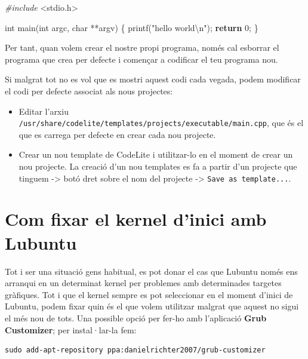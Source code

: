 \documentclass[]{book}
\newenvironment{Shaded}{\begin{snugshade}}{\end{snugshade}}
\newcommand{\DataTypeTok}[1]{\textcolor[rgb]{0.13,0.29,0.53}{#1}}
\newcommand{\DecValTok}[1]{\textcolor[rgb]{0.00,0.00,0.81}{#1}}
\newcommand{\SpecialCharTok}[1]{\textcolor[rgb]{0.00,0.00,0.00}{#1}}
\newcommand{\StringTok}[1]{\textcolor[rgb]{0.31,0.60,0.02}{#1}}
\newcommand{\ImportTok}[1]{#1}
\newcommand{\ControlFlowTok}[1]{\textcolor[rgb]{0.13,0.29,0.53}{\textbf{#1}}}
\newcommand{\PreprocessorTok}[1]{\textcolor[rgb]{0.56,0.35,0.01}{\textit{#1}}}
\newcommand{\NormalTok}[1]{#1}
\providecommand{\tightlist}{%
  \setlength{\itemsep}{0pt}\setlength{\parskip}{0pt}}
\begin{document}
\begin{Shaded}
\begin{Highlighting}[]
\PreprocessorTok{#include }\ImportTok{<stdio.h>}

\DataTypeTok{int}\NormalTok{ main(}\DataTypeTok{int}\NormalTok{ argc, }\DataTypeTok{char}\NormalTok{ **argv)}
\NormalTok{\{}
\NormalTok{    printf(}\StringTok{"hello world}\SpecialCharTok{\textbackslash{}n}\StringTok{"}\NormalTok{);}
    \ControlFlowTok{return} \DecValTok{0}\NormalTok{;}
\NormalTok{\}}
\end{Highlighting}
\end{Shaded}

Per tant, quan volem crear el nostre propi programa, només cal esborrar
el programa que crea per defecte i començar a codificar el teu programa
nou.

Si malgrat tot no es vol que es mostri aquest codi cada vegada, podem
modificar el codi per defecte associat als nous projectes:

\begin{itemize}
\tightlist
\item
  Editar l'arxiu
  \texttt{/usr/share/codelite/templates/projects/executable/main.cpp},
  que és el que es carrega per defecte en crear cada nou projecte.
\item
  Crear un nou template de CodeLite i utilitzar-lo en el moment de crear
  un nou projecte. La creació d'un nou templates es fa a partir d'un
  projecte que tinguem -\textgreater{} botó dret sobre el nom del
  projecte -\textgreater{} \texttt{Save\ as\ template...}.
\end{itemize}

\section{Com fixar el kernel d'inici amb
Lubuntu}\label{com-fixar-el-kernel-dinici-amb-lubuntu}

Tot i ser una situació gens habitual, es pot donar el cas que Lubuntu
només ens arranqui en un determinat kernel per problemes amb
determinades targetes gràfiques. Tot i que el kernel sempre es pot
seleccionar en el moment d'inici de Lubuntu, podem fixar quin és el que
volem utilitzar malgrat que aquest no sigui el més nou de tots. Una
possible opció per fer-ho amb l'aplicació \textbf{Grub Customizer}; per
instal·lar-la fem:

\begin{verbatim}
sudo add-apt-repository ppa:danielrichter2007/grub-customizer
\end{verbatim}
\end{document}
